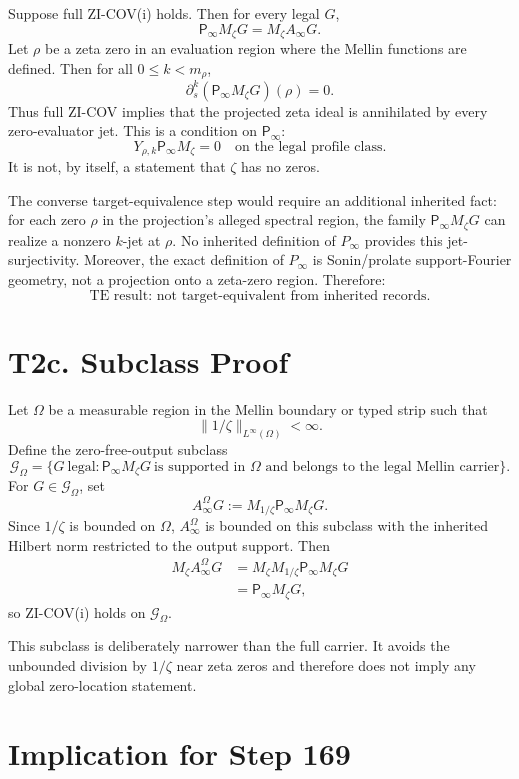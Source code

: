\documentclass[11pt]{article}
\newcommand{\Psym}{\mathsf P_\infty}
\newcommand{\Mz}{M_\zeta}
\begin{document}
Suppose full ZI-COV(i) holds. Then for every legal \(G\),
\[
  \Psym\Mz G=\Mz A_\infty G.
\]
Let \(\rho\) be a zeta zero in an evaluation region where the Mellin functions
are defined. Then for all \(0\le k<m_\rho\),
\[
  \partial_s^k(\Psym\Mz G)(\rho)=0.
\]
Thus full ZI-COV implies that the projected zeta ideal is annihilated by every
zero-evaluator jet. This is a condition on \(\Psym\):
\[
  Y_{\rho,k}\Psym M_\zeta=0
  \quad\text{on the legal profile class}.
\]
It is not, by itself, a statement that \(\zeta\) has no zeros.

The converse target-equivalence step would require an additional inherited fact:
for each zero \(\rho\) in the projection's alleged spectral region, the family
\(\Psym\Mz G\) can realize a nonzero \(k\)-jet at \(\rho\). No inherited
definition of \(P_\infty\) provides this jet-surjectivity. Moreover, the exact
definition of \(P_\infty\) is Sonin/prolate support-Fourier geometry, not a
projection onto a zeta-zero region. Therefore:
\[
  \boxed{\text{TE result: not target-equivalent from inherited records}.}
\]

\section{T2c. Subclass Proof}

Let \(\Omega\) be a measurable region in the Mellin boundary or typed strip
such that
\[
  \|1/\zeta\|_{L^\infty(\Omega)}<\infty.
\]
Define the zero-free-output subclass
\[
  \mathcal G_\Omega
  =
  \{G\ \text{legal}:
    \Psym\Mz G\ \text{is supported in }\Omega
    \text{ and belongs to the legal Mellin carrier}\}.
\]
For \(G\in\mathcal G_\Omega\), set
\[
  A_\infty^\Omega G
  :=
  M_{1/\zeta}\Psym\Mz G.
\]
Since \(1/\zeta\) is bounded on \(\Omega\), \(A_\infty^\Omega\) is bounded on
this subclass with the inherited Hilbert norm restricted to the output support.
Then
\[
\begin{aligned}
  \Mz A_\infty^\Omega G
  &=
  M_\zeta M_{1/\zeta}\Psym\Mz G
  \\
  &=
  \Psym\Mz G,
\end{aligned}
\]
so ZI-COV(i) holds on \(\mathcal G_\Omega\).

This subclass is deliberately narrower than the full carrier. It avoids the
unbounded division by \(1/\zeta\) near zeta zeros and therefore does not imply
any global zero-location statement.

\section{Implication for Step 169}
\end{document}
